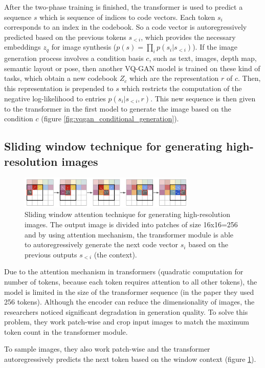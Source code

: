 After the two-phase training is finished, the transformer is used to predict a sequence $s$ which is sequence of indices to code vectors. Each token $s_i$ corresponds to an index in the codebook. So a code vector is autoregressively predicted based on the previous tokens $s_{<i}$, which provides the necessary embeddings $z_q$ for image synthesis ($p(s) = \prod_{i} p(s_i | s_{<i})$). If the image generation process involves a condition basis $c$, such as text, images, depth map, semantic layout or pose, then another VQ-GAN model is trained on these kind of tasks, which obtain a new codebook $Z_c$ which are the representation $r$ of $c$. Then, this representation is prepended to $s$ which restricts the computation of the negative log-likelihood to entries $p(s_i | s_{<i}, r)$. This new sequence is then given to the transformer in the first model to generate the image based on the condition $c$ (figure \ref{fig:vqgan_conditional_generation}).








\subsection{Sliding window technique for generating high-resolution images}

\begin{figure}[h]
    \centering
    \includegraphics[width=0.75\textwidth]{images/vqgan_sliding_attention.png}
    \caption{Sliding window attention technique for generating high-resolution images. The output image is divided into patches of size 16x16=256 and by using attention mechanism, the transformer module is able to autoregressively generate the next code vector $s_i$ based on the previous outputs $s_{<i}$ (the context).}
    \label{fig:vqgan_sliding_window}
\end{figure}

Due to the attention mechanism in transformers (quadratic computation for number of tokens, because each token requires attention to all other tokens), the model is limited in the size of the transformer sequence (in the paper they used 256 tokens). Although the encoder can reduce the dimensionality of images, the researchers noticed significant degradation in generation quality. To solve this problem, they work patch-wise and crop input images to match the maximum token count in the transformer module.

To sample images, they also work patch-wise and the transformer autoregressively predicts the next token based on the window context (figure \ref{fig:vqgan_sliding_window}).

